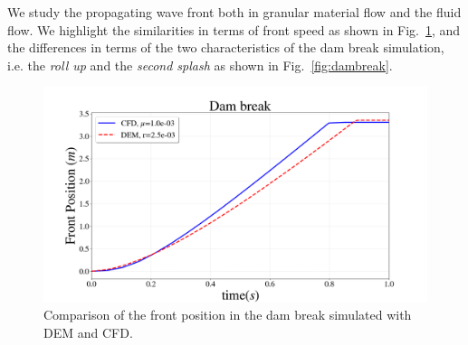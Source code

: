 We study the propagating wave front both in granular material flow and the fluid flow. We highlight the similarities in terms of front speed as shown in Fig.~\ref{fig:front_pos}, and the differences in terms of the two characteristics of the dam break simulation, i.e. the \textit{roll up} and the \textit{second splash} \cite{miladHalfImplicit2018} as shown in Fig.~\ref{fig:dambreak}.
\begin{figure}[H]
	\begin{center}
		\includegraphics[width=.6\textwidth]{images/CFD_DEM/Figure_Dambreak.png}
	\end{center}
	\caption{Comparison of the front position in the dam break simulated with DEM and CFD.}
	\label{fig:front_pos}
\end{figure}
